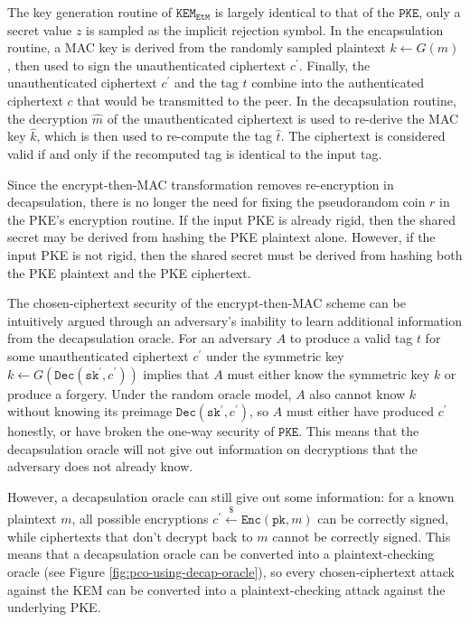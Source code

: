 \documentclass[journal=tches,submission]{iacrtrans}
\newcommand{\pke}{\texttt{PKE}}
\newcommand{\encrypt}{\texttt{Enc}}
\newcommand{\decrypt}{\texttt{Dec}}
\newcommand{\kem}{\texttt{KEM}}
\newcommand{\etm}{\texttt{EtM}}  %
\newcommand{\pk}{\texttt{pk}}
\newcommand{\sk}{\texttt{sk}}
\newcommand{\leftsample}{\stackrel{\$}{\leftarrow}}
\begin{document}
The key generation routine of $\kem_\etm$ is largely identical to that of the $\pke$, only a secret value $z$ is sampled as the implicit rejection symbol. In the encapsulation routine, a MAC key is derived from the randomly sampled plaintext $k \leftarrow G(m)$, then used to sign the unauthenticated ciphertext $c^\prime$. Finally, the unauthenticated ciphertext $c^\prime$ and the tag $t$ combine into the authenticated ciphertext $c$ that would be transmitted to the peer. In the decapsulation routine, the decryption $\hat{m}$ of the unauthenticated ciphertext is used to re-derive the MAC key $\hat{k}$, which is then used to re-compute the tag $\hat{t}$. The ciphertext is considered valid if and only if the recomputed tag is identical to the input tag.

Since the encrypt-then-MAC transformation removes re-encryption in decapsulation, there is no longer the need for fixing the pseudorandom coin $r$ in the PKE's encryption routine. If the input PKE is already rigid, then the shared secret may be derived from hashing the PKE plaintext alone. However, if the input PKE is not rigid, then the shared secret must be derived from hashing both the PKE plaintext and the PKE ciphertext. 

The chosen-ciphertext security of the encrypt-then-MAC scheme can be intuitively argued through an adversary's inability to learn additional information from the decapsulation oracle. For an adversary $A$ to produce a valid tag $t$ for some unauthenticated ciphertext $c^\prime$ under the symmetric key $k \leftarrow G(\decrypt(\sk^\prime, c^\prime))$ implies that $A$ must either know the symmetric key $k$ or produce a forgery. Under the random oracle model, $A$ also cannot know $k$ without knowing its preimage $\decrypt(\sk^\prime, c^\prime)$, so $A$ must either have produced $c^\prime$ honestly, or have broken the one-way security of $\pke$. This means that the decapsulation oracle will not give out information on decryptions that the adversary does not already know. 

However, a decapsulation oracle can still give out some information: for a known plaintext $m$, all possible encryptions $c^\prime \leftsample \encrypt(\pk, m)$ can be correctly signed, while ciphertexts that don't decrypt back to $m$ cannot be correctly signed. This means that a decapsulation oracle can be converted into a plaintext-checking oracle (see Figure \ref{fig:pco-using-decap-oracle}), so every chosen-ciphertext attack against the KEM can be converted into a plaintext-checking attack against the underlying PKE.
\end{document}
